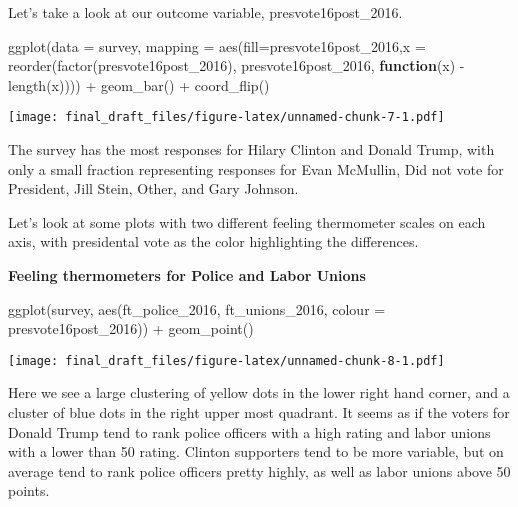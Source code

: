 \documentclass[
]{article}
\newenvironment{Shaded}{\begin{snugshade}}{\end{snugshade}}
\newcommand{\AttributeTok}[1]{\textcolor[rgb]{0.77,0.63,0.00}{#1}}
\newcommand{\ControlFlowTok}[1]{\textcolor[rgb]{0.13,0.29,0.53}{\textbf{#1}}}
\newcommand{\FunctionTok}[1]{\textcolor[rgb]{0.00,0.00,0.00}{#1}}
\newcommand{\NormalTok}[1]{#1}
\newcommand{\SpecialCharTok}[1]{\textcolor[rgb]{0.00,0.00,0.00}{#1}}
\begin{document}
Let's take a look at our outcome variable, presvote16post\_2016.

\begin{Shaded}
\begin{Highlighting}[]
\FunctionTok{ggplot}\NormalTok{(}\AttributeTok{data =}\NormalTok{ survey, }\AttributeTok{mapping =} \FunctionTok{aes}\NormalTok{(}\AttributeTok{fill=}\NormalTok{presvote16post\_2016,}\AttributeTok{x =} \FunctionTok{reorder}\NormalTok{(}\FunctionTok{factor}\NormalTok{(presvote16post\_2016), presvote16post\_2016, }\ControlFlowTok{function}\NormalTok{(x) }\SpecialCharTok{{-}}\FunctionTok{length}\NormalTok{(x)))) }\SpecialCharTok{+} \FunctionTok{geom\_bar}\NormalTok{() }\SpecialCharTok{+} \FunctionTok{coord\_flip}\NormalTok{()}
\end{Highlighting}
\end{Shaded}

\texttt{[image: final\_draft\_files/figure-latex/unnamed-chunk-7-1.pdf]}

The survey has the most responses for Hilary Clinton and Donald Trump,
with only a small fraction representing responses for Evan McMullin, Did
not vote for President, Jill Stein, Other, and Gary Johnson.

Let's look at some plots with two different feeling thermometer scales
on each axis, with presidental vote as the color highlighting the
differences.

\textbf{Feeling thermometers for Police and Labor Unions}

\begin{Shaded}
\begin{Highlighting}[]
\FunctionTok{ggplot}\NormalTok{(survey, }\FunctionTok{aes}\NormalTok{(ft\_police\_2016, ft\_unions\_2016, }\AttributeTok{colour =}\NormalTok{ presvote16post\_2016)) }\SpecialCharTok{+} 
  \FunctionTok{geom\_point}\NormalTok{()}
\end{Highlighting}
\end{Shaded}

\texttt{[image: final\_draft\_files/figure-latex/unnamed-chunk-8-1.pdf]}

Here we see a large clustering of yellow dots in the lower right hand
corner, and a cluster of blue dots in the right upper most quadrant. It
seems as if the voters for Donald Trump tend to rank police officers
with a high rating and labor unions with a lower than 50 rating. Clinton
supporters tend to be more variable, but on average tend to rank police
officers pretty highly, as well as labor unions above 50 points.
\end{document}

